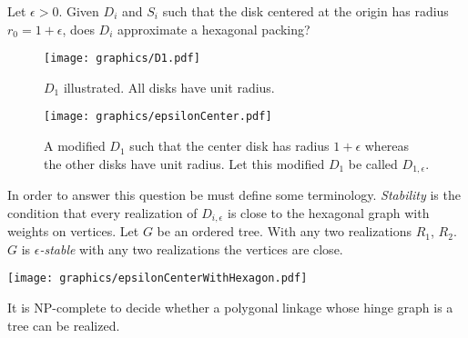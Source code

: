 \begin{prob}
Let $\epsilon > 0$.  Given $D_i$ and $S_i$ such that the disk centered at the origin has radius $r_0 = 1+\epsilon$, does $D_i$ approximate a hexagonal packing?
\end{prob}
\begin{figure}[!htbp]
\centering
\begin{minipage}{0.45\textwidth}
\centering
\texttt{[image: graphics/D1.pdf]}
\caption{$D_1$ illustrated.  All disks have unit radius.}\label{fig:D1}
\end{minipage}\hfill
\begin{minipage}{0.45\textwidth}
\centering
\texttt{[image: graphics/epsilonCenter.pdf]}
\caption{A modified $D_1$ such that the center disk has radius $1+\epsilon$ whereas the other disks have unit radius.  Let this modified $D_1$ be called $D_{1,\epsilon}$.}\label{fig:epsilonCenter}
\end{minipage}
\end{figure}
In order to answer this question be must define some terminology.  \textit{Stability} is the condition that every realization of $D_{i,\epsilon}$ is close to the hexagonal graph with weights on vertices.  Let $G$ be an ordered tree. With any two realizations $R_1$, $R_2$.  $G$ is \textit{$\epsilon$-stable} with any two realizations the vertices are close.

\begin{minipage}{\linewidth}
\begin{center}
\texttt{[image: graphics/epsilonCenterWithHexagon.pdf]}
\label{fig:epsilonCenterWithHexagon}
\end{center}
\end{minipage}


\begin{thm}\label{thm:ContactGraphV3-1}
It is NP-complete to decide whether a polygonal linkage whose hinge graph is a tree can be realized.
\end{thm}
 
